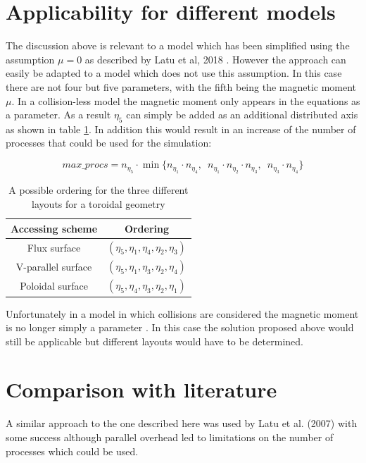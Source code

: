 \section{Applicability for different models}

The discussion above is relevant to a model which has been simplified using the assumption $\mu=0$ as described by Latu et al, 2018 \cite{YamanPaper}. However the approach can easily be adapted to a model which does not use this assumption. In this case there are not four but five parameters, with the fifth being the magnetic moment $\mu$. In a collision-less model the magnetic moment only appears in the equations as a parameter. As a result $\eta_5$ can simply be added as an additional distributed axis as shown in table \ref{tab::Toroidal Ordering}. In addition this would result in an increase of the number of processes that could be used for the simulation:

$$max\_procs = n_{\eta_5} \cdot \min\{n_{\eta_1}\!\!\cdot n_{\eta_4},\, \, \, n_{\eta_1}\!\!\cdot n_{\eta_2}\!\! \cdot n_{\eta_3},\, \, \, n_{\eta_3}\!\!\cdot n_{\eta_4}\}$$

\begin{table}[ht]
\begin{center}
 \begin{tabular}{|c|c|}
  \hline
  Accessing scheme & Ordering\\
  \hline
  Flux surface & $(\eta_5, \eta_1,\eta_4,\eta_2,\eta_3)$\\
  \hline
  V-parallel surface & $(\eta_5, \eta_1,\eta_3,\eta_2,\eta_4)$\\
  \hline
  Poloidal surface & $(\eta_5, \eta_4,\eta_3,\eta_2,\eta_1)$\\
  \hline
 \end{tabular}
 \caption{\label{tab::Toroidal Ordering} A possible ordering for the three different layouts for a toroidal geometry}
\end{center}
\end{table}

Unfortunately in a model in which collisions are considered the magnetic moment is no longer simply a parameter .
In this case the solution proposed above would still be applicable but different layouts would have to be determined.

\section{Comparison with literature}


A similar approach to the one described here was used by Latu et al. (2007) \cite{ParallelisationSemi-LagrangianVlasovCodes} with some success although parallel overhead led to limitations on the number of processes which could be used.


% 
